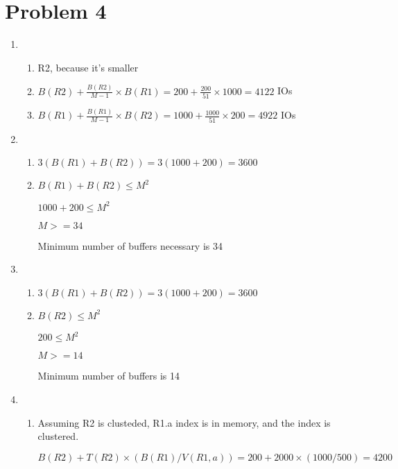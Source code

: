 \documentclass[a4paper, 12pt]{article}
\begin{document}
\section*{Problem 4}

\begin{enumerate}
	\item
		\begin{enumerate}[label=\alph*.]
			\item R2, because it's smaller
			\item $ B(R2) + \frac{B(R2)}{M - 1} \times B(R1) = 200 +
				\frac{200}{51} \times 1000 = 4122 $ IOs
			\item $ B(R1) + \frac{B(R1)}{M - 1} \times B(R2) = 1000 +
				\frac{1000}{51} \times 200 = 4922 $ IOs
		\end{enumerate}

	\item
		\begin{enumerate}[label=\alph*.]
			\item $ 3 (B(R1) + B(R2)) = 3 (1000 + 200) = 3600 $
			\item $ B(R1) + B(R2) \leq M^2 $

				$ 1000 + 200 \leq M^2 $

				$ M >= 34 $

				Minimum number of buffers necessary is 34	
		\end{enumerate}

	\item
		\begin{enumerate}[label=\alph*.]
			\item $ 3 (B(R1) + B(R2)) = 3 (1000 + 200) = 3600 $
			\item $ B(R2) \leq M^2 $

				$ 200 \leq M^2 $

				$ M >= 14 $

				Minimum number of buffers is 14
		\end{enumerate}

	\item
		\begin{enumerate}[label=\alph*.]
			\item Assuming R2 is clusteded, R1.a index is in memory, and the
				index is clustered.

				$ B(R2) + T(R2) \times (B(R1) / V(R1,a)) = 200 + 2000 \times (
				1000 / 500 ) = 4200 $
		\end{enumerate}
\end{enumerate}
\end{document}
